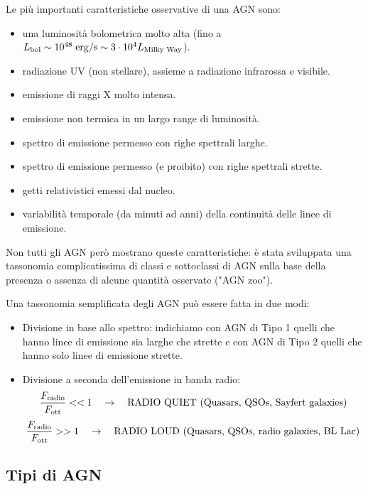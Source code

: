 Le più importanti caratteristiche osservative di una AGN sono:
\begin{itemize}
    \item una luminosità bolometrica molto alta (fino a $L_\textup{bol} \sim 10^{48} \;\si{erg}/\si{s} \sim 3\cdot 10^4 L_\textup{Milky Way}$).
    \item radiazione UV (non stellare), assieme a radiazione infrarossa e visibile.
    \item emissione di raggi X molto intensa.
    \item emissione non termica in un largo range di luminosità.
    \item spettro di emissione permesso con righe spettrali larghe.
    \item spettro di emissione permesso (e proibito) con righe spettrali strette. 
    \item getti relativistici emessi dal nucleo.
    \item variabilità temporale (da minuti ad anni) della continuità delle linee di emissione.
\end{itemize}
Non tutti gli AGN però mostrano queste caratteristiche: è stata sviluppata una tassonomia complicatissima di classi e sottoclassi di AGN sulla base della presenza o assenza di alcune quantità osservate ("AGN zoo").

Una tassonomia semplificata degli AGN può essere fatta in due modi:
\begin{itemize}
    \item Divisione in base allo spettro: indichiamo con AGN di Tipo 1 quelli che hanno linee di emissione sia larghe che strette e con AGN di Tipo 2 quelli che hanno solo linee di emissione strette.
    \item Divisione a seconda dell'emissione in banda radio: 
    \begin{equation*}
        \frac{F_\textup{radio}}{F_\textup{ott}} << 1 \quad \rightarrow \quad \text{RADIO QUIET (Quasars, QSOs, Sayfert galaxies)}
    \end{equation*}
    \begin{equation*}
        \frac{F_\textup{radio}}{F_\textup{ott}} >> 1 \quad \rightarrow \quad \text{RADIO LOUD (Quasars, QSOs, radio galaxies, BL Lac)}
    \end{equation*}
\end{itemize}

\subsection{Tipi di AGN}
